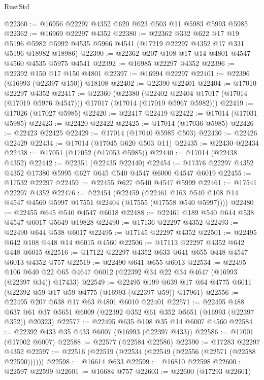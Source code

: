 \begin{lexlean}{RustStd}
\begin{coremodule}
@22360 := @16956 @22297 @4352 @620 @623 @503 @11 @5983 @5993 @5985
@22362 := @16969 @22297 @4352
@22380 := @22362
    @332
    @622
    @17
    @19
    @5196
    @5982
    @5992
    @4535
    @5966
    @4541
    (@17219 @22297 @4352 @17 @331 @5196 @18982 @18986)
@22390 := @22362 @207 @108 @17 @14 @4801 @4547 @4560 @4535 @5975 @4541
@22392 := @16985 @22297 @4352
@22396 := @22392 @150 @17 @150 @4801
@22397 := @16994 @22297
@22401 := @22396 (@16993 (@22397 @150)) @18108
@22402 := @22390 @22401
@22404 := @17010 @22297 @4352
@22417 := @22360
    (@22380
      (@22402 @22404 @17017 (@17014 (@17019 @5976 @4547)))
      @17017
      (@17014 (@17019 @5967 @5982)))
@22419 := @17026 (@17027 @5985)
@22420 := @22417 @22419
@22422 := @17014 (@17031 @5985)
@22423 := @22420 @22422
@22425 := @17014 (@17036 @5985)
@22426 := @22423 @22425
@22429 := @17014 (@17040 @5985 @503)
@22430 := @22426 @22429
@22434 := @17014 (@17045 @620 @503 @11)
@22435 := @22430 @22434
@22438 := @17051 (@17052 (@17053 @5985))
@22440 := @17014 (@22438 @4352)
@22442 := @22351 (@22435 @22440)
@22454 := @17376 @22297 @4352 @4352 @17380 @5995 @627 @645 @540 @4547 @6000 @4547 @6019
@22455 := @17532 @22297
@22459 := @22455 @627 @540 @4547 @5999
@22461 := @17541 @22297 @4352
@22476 := @22454
    (@22459
      (@22461 @163 @540 @108 @14 @4547 @4560 @5997 @17551 @22404 (@17555 (@17558 @540 @5997))))
@22480 := @22455 @645 @540 @4547 @6018
@22488 := @22461 @189 @540 @644 @538 @4547 @6017 @5649 @19828
@22490 := @17136 @22297 @4352
@22493 := @22490 @644 @538 @6017
@22495 := @17145 @22297 @4352
@22501 := @22495 @642 @108 @448 @14 @6015 @4560
@22506 := @17113 @22297 @4352 @642 @448 @6015
@22516 := @17122 @22297 @4352 @633 @641 @655 @448 @4547 @6013 @4352 @757
@22519 := @22490 @641 @655 @6013
@22534 := @22495
    @106
    @640
    @22
    @65
    @4647
    @6012
    (@22392 @34 @22 @34 @4647 (@16993 (@22397 @34)) @17433)
@22549 := @22495
    @199
    @639
    @17
    @64
    @4775
    @6011
    (@22392 @59 @17 @59 @4775 (@16993 (@22397 @59)) @17961)
@22556 := @22495 @207 @638 @17 @63 @4801 @6010 @22401
@22571 := @22495
    @488
    @637
    @61
    @37
    @5651
    @6009
    (@22392 @352 @61 @352 @5651 (@16993 (@22397 @352)) @20323)
@22577 := @22495 @635 @108 @35 @14 @6007 @4560
@22584 := @22392 @433 @35 @433 @6007 (@16993 (@22397 @433))
@22586 := @17001 (@17002 @6007)
@22588 := @22577 (@22584 @22586)
@22590 := @17283 @22297 @4352
@22597 := @22516 (@22519 (@22534 (@22549 (@22556 (@22571 (@22588 @22590))))))
@22598 := @16614 @633
@22599 := @16810 @22598
@22600 := @22597 @22599
@22601 := @16684 @757
@22603 := @22600 (@17293 @22601)

\end{coremodule}
\end{lexlean}
